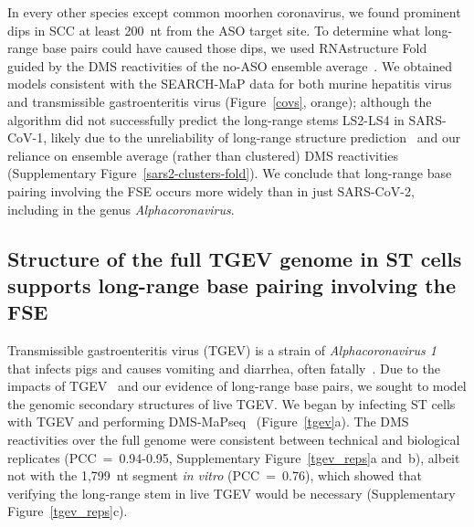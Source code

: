 \documentclass[main.tex]{subfiles}
\begin{document}
In every other species except common moorhen coronavirus, we found prominent dips in SCC at least 200~nt from the ASO target site.
To determine what long-range base pairs could have caused those dips, we used RNAstructure Fold~\cite{Reuter2010} guided by the DMS reactivities of the no-ASO ensemble average~\cite{Cordero2012}.
We obtained models consistent with the SEARCH-MaP data for both murine hepatitis virus and transmissible gastroenteritis virus (Figure~\ref{covs}, orange); although the algorithm did not successfully predict the long-range stems LS2-LS4 in SARS-CoV-1, likely due to the unreliability of long-range structure prediction~\cite{Nicholson2015} and our reliance on ensemble average (rather than clustered) DMS reactivities (Supplementary Figure~\ref{sars2-clusters-fold}).
We conclude that long-range base pairing involving the FSE occurs more widely than in just SARS-CoV-2, including in the genus \textit{Alphacoronavirus}.

\subsection{Structure of the full TGEV genome in ST cells supports long-range base pairing involving the FSE}

Transmissible gastroenteritis virus (TGEV) is a strain of \textit{Alphacoronavirus 1}~\cite{Whittaker2018} that infects pigs and causes vomiting and diarrhea, often fatally~\cite{Liu2021}.
Due to the impacts of TGEV~\cite{Liu2021} and our evidence of long-range base pairs, we sought to model the genomic secondary structures of live TGEV.
We began by infecting ST cells with TGEV and performing DMS-MaPseq~\cite{Zubradt2016} (Figure~\ref{tgev}a).
The DMS reactivities over the full genome were consistent between technical and biological replicates (PCC~=~0.94-0.95, Supplementary Figure~\ref{tgev_reps}a and~b), albeit not with the 1,799~nt segment \textit{in vitro} (PCC~=~0.76), which showed that verifying the long-range stem in live TGEV would be necessary (Supplementary Figure~\ref{tgev_reps}c).
\end{document}

